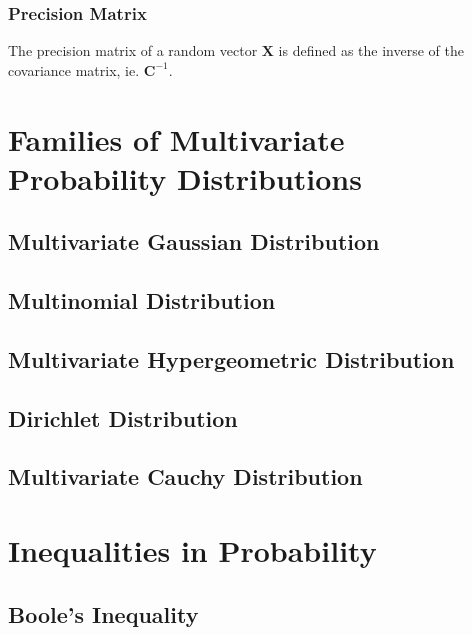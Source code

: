 \documentclass[11pt]{report} %
\begin{document}
\subsubsection{Precision Matrix}

The precision matrix of a random vector $\mathbf{X}$ is defined as the inverse of the covariance matrix, ie. $\mathbf{C}^{-1}$.

\section{Families of Multivariate Probability Distributions}

\subsection{Multivariate Gaussian Distribution}

\subsection{Multinomial Distribution}

\subsection{Multivariate Hypergeometric Distribution}

\subsection{Dirichlet Distribution}

\subsection{Multivariate Cauchy Distribution} 

\section{Inequalities in Probability}

\subsection{Boole's Inequality}
\end{document}
